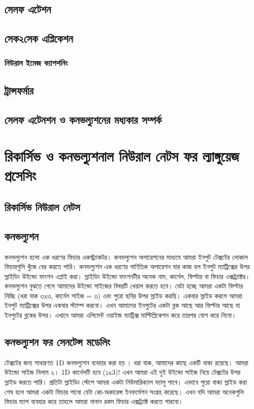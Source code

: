 \documentclass{book}
\begin{document}
\subsection{সেলফ এটেশন}
\subsection{সেক২সেক এপ্লিকেশন}
\subsubsection{নিউরাল ইমেজ ক্যাপশনিং}
\subsection{ট্রান্সফর্মার}
\subsection{সেলফ এটেনশন ও কনভল্যুশনের মধ্যকার সম্পর্ক}

\section{রিকার্সিভ ও কনভল্যুশনাল নিউরাল নেটস ফর ল্যাঙ্গুয়েজ প্রসেসিং}
\subsection{রিকার্সিভ নিউরাল নেটস}
\subsection{কনভল্যুশন}
কনভল্যুশন হলো এক ধরণের ফিচার একস্ট্র্যাকটর। কনভল্যুশন অপারেশনের মাধ্যমে আমরা ইনপুট টেক্সটের লোকাল ফিচারগুলি খুঁজে বের করতে পারি। 
কনভল্যুশন এক ধরণের গাণিতিক অপারেশন যার কাজ হল ইনপুট ম্যাট্রিক্সের উপর স্লাইডিং উইন্ডো ফাংশন এপ্লাই করা।
স্লাইডিং উইন্ডো ফাংশনটীর অনেক নাম, কার্নেল, ফিল্টার বা ফিচার এক্সট্র্যাক্টর। কনভল্যুশন বুঝতে গেলে আমাদের উইন্ডো সাইজের বিষয়টি খেয়াল করতে হবে। 
যেটা হচ্ছে আমরা একটা ফিল্টার নিচ্ছি (ধরা যাক ৩x৩, কার্নেল সাইজ = ৩) এবং পুরো ছবির উপর স্লাইড করছি।
একবার স্লাইড করলে আমরা ইনপুট ম্যাট্রিক্সের উপর একবার স্ট্যাম্প করবো। এখন আমাদের ইনপুটের একটা ব্লক আছে আর ফিল্টার আছে যা ইনপুটের ব্লকের উপর। 
এখানে আমরা এলিমেন্ট ওয়াইজ ম্যাট্রিক্স মাল্টিপ্লিকেশন করে তারপর যোগ করে নিবো।



\subsection{কনভল্যুশন ফর সেনটেন্স মডেলিং}
টেক্সটের জন্য সাধারণত 1D কনভল্যুশন ব্যবহার করা হয় \cite{kalchbrenner-etal-2014-convolutional}।  ধরা যাক, আমাদের কাছে একটি বাক্য রয়েছে।  আমরা উইন্ডো সাইজ নিলাম ২। 1D কার্নেলটি হবে (১x3)!  
এখন আমরা এই দুই উইন্ডো সাইজ নিয়ে টেক্সটের উপর স্লাইড করতে পারি। প্রতিটা স্লাইডিং স্টেপে আমরা একটা নিউমারিক্যাল ভ্যালু পাবে। 
এভাবে পুরো বাক্য স্লাইড করা শেষ হলে আমরা একটা ফিচার পাবো যেটা কো-অকারেন্স ইনফর্মেশন সংগ্রহ করেছে। 
এখন যদি আমরা অনেকগুলি ফিচার ম্যাপ ব্যবহার করে তাহলে আমরা নানান রকম ফিচার এক্সট্র্যাক্ট করতে পারবো। 
\end{document}

